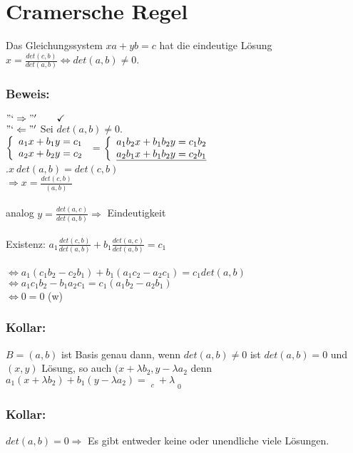 \section{Cramersche Regel}
Das Gleichungssystem $xa+yb=c$ hat die eindeutige Lösung $x = \frac{det(c,b)}{det(a,b)} \Leftrightarrow det(a,b) \neq 0$.
%
%
%
\subsubsection{Beweis: }
$"`\Rightarrow "' \qquad \checkmark$\\
$"`\Leftarrow "'$ Sei $det(a,b) \neq 0$.\\
$ \left\{
  \begin{array}{l l}
    a_{1}x + b_{1}y = c_{1} \\
    a_{2}x + b_{2}y = c_{2}
  \end{array} \right.$
=
$\left\{
\begin{array}{l l}
a_{1}b_{2}x+b_{1}b_{2}y=c_{1}b_{2} \\
\underline{ a_{2}b_{1}x+b_{1}b_{2}y=c_{2}b_{1} }
\end{array} \right.$\\
.\qquad\qquad\qquad\qquad\qquad $x ~ det(a,b)  = det(c,b)$\\
$\Rightarrow x = \frac{det(c,b)}{(a,b)}$\\
\quad\\
analog $y=\frac{det(a,c)}{det(a,b)} \Rightarrow$ Eindeutigkeit\\
\quad\\
Existenz: $a_{1} \frac{det(c,b)}{det(a,b)} + b_{1} \frac{det(a,c)}{det(a,b)} = c_{1}$\\
\quad\\
$\Leftrightarrow a_{1}(c_{1}b_{2}-c_{2}b_{1})+b_{1}(a_{1}c_{2}-a_{2}c_{1})=c_{1} det(a,b)$\\
$\Leftrightarrow a_{1}c_{1}b_{2} - b_{1}a_{2}c_{1} = c_{1}(a_{1}b_{2}-a_{2}b_{1})$\\
$\Leftrightarrow 0 = 0$ (w)
%
%
%
\subsubsection{Kollar:}
$B=(a,b)$ ist Basis genau dann, wenn $det(a,b) \neq 0$ ist $det(a,b)=0$ und $(x,y)$ Lösung, so auch $(x+\lambda b_{2}, y-\lambda a_{2}$ denn $a_{1}(x+\lambda b_{2})+b_{1}(y-\lambda a_{2})=\mathop{\underbrace{a_{1}x+b_{1}y}}\limits_{c}+\lambda\mathop{\underbrace{(a_{1} b_{2}-b_{1}a_{2})}}\limits_{0}$
%
%
%
\subsubsection{Kollar:}
$det(a,b)=0 \Rightarrow$ Es gibt entweder keine oder unendliche viele Lösungen.
